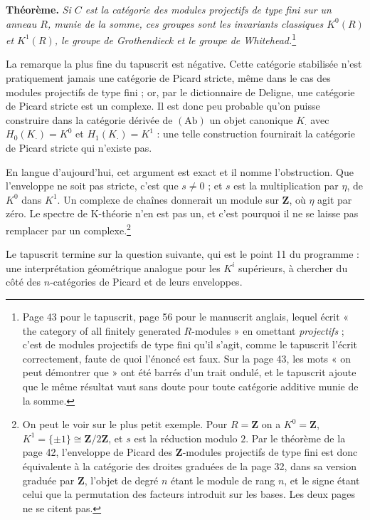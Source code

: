 \documentclass[11pt,a4paper]{article}
\begin{document}
\textbf{Théorème.} \emph{Si $C$ est la catégorie des modules projectifs de
type fini sur un anneau $R$, munie de la somme, ces groupes sont les
invariants classiques $K^{0}(R)$ et $K^{1}(R)$, le groupe de Grothendieck et
le groupe de Whitehead.}\footnote{Page 43 pour le tapuscrit, page 56 pour le
manuscrit anglais, lequel écrit « the category of all finitely generated
$R$-modules » en omettant \emph{projectifs} ; c'est de modules projectifs de
type fini qu'il s'agit, comme le tapuscrit l'écrit correctement, faute de quoi
l'énoncé est faux. Sur la page 43, les mots « on peut démontrer que » ont été
barrés d'un trait ondulé, et le tapuscrit ajoute que le même résultat vaut
sans doute pour toute catégorie additive munie de la somme.}

La remarque la plus fine du tapuscrit est négative. Cette
catégorie stabilisée n'est pratiquement jamais une catégorie de Picard
stricte, même dans le cas des modules projectifs de type fini ; or, par le
dictionnaire de Deligne, une catégorie de Picard stricte est un complexe. Il
est donc peu probable qu'on puisse construire dans la catégorie dérivée de
$(\mathrm{Ab})$ un objet canonique $K_{\cdot}$ avec $H_{0}(K_{\cdot}) = K^{0}$
et $H_{1}(K_{\cdot}) = K^{1}$ : une telle construction fournirait la catégorie de Picard stricte qui n'existe pas.

En langue d'aujourd'hui, cet argument est exact et il nomme l'obstruction.
Que l'enveloppe ne soit pas stricte, c'est que $s \neq 0$ ; et $s$ est la
multiplication par $\eta$, de $K^{0}$ dans $K^{1}$. Un complexe de chaînes
donnerait un module sur $\mathbf{Z}$, où $\eta$ agit par zéro. Le spectre de
K-théorie n'en est pas un, et c'est pourquoi il ne se laisse pas remplacer par
un complexe.\footnote{On peut le voir sur le plus petit exemple. Pour $R =
\mathbf{Z}$ on a $K^{0} = \mathbf{Z}$, $K^{1} = \{\pm 1\} \cong
\mathbf{Z}/2\mathbf{Z}$, et $s$ est la réduction modulo $2$. Par le théorème
de la page 42, l'enveloppe de Picard des $\mathbf{Z}$-modules projectifs de
type fini est donc équivalente à la catégorie des droites graduées de la page
32, dans sa version graduée par $\mathbf{Z}$, l'objet de degré $n$ étant le
module de rang $n$, et le signe étant celui que la permutation des facteurs
introduit sur les bases. Les deux pages ne se citent pas.}

Le tapuscrit termine sur la question suivante, qui est le point 11 du
programme : une interprétation géométrique analogue pour les $K^{i}$
supérieurs, à chercher du côté des $n$-catégories de Picard et de leurs
enveloppes.
\end{document}
